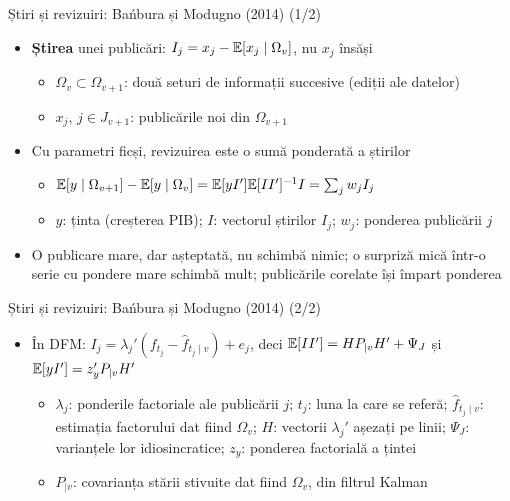 \begin{frame}{Știri și revizuiri: Bańbura și Modugno (2014) (1/2)}
\itemsize{\small}
\begin{itemize}
    \item \textbf{Știrea} unei publicări: $I_j = x_j - \mathbb{E}[x_j\mid\Omega_v]$, nu $x_j$ însăși
    \begin{itemize}
        \item $\Omega_v \subset \Omega_{v+1}$: două seturi de informații succesive (ediții ale datelor)
        \item $x_j$, $j \in J_{v+1}$: publicările noi din $\Omega_{v+1}$
    \end{itemize}
    \item Cu parametri ficși, revizuirea este o sumă ponderată a știrilor 
    \begin{itemize}
        \item $\mathbb{E}[y\mid\Omega_{v+1}] - \mathbb{E}[y\mid\Omega_v] = \mathbb{E}[yI']\mathbb{E}[II']^{-1}I = \sum_j w_jI_j$
        \item $y$: ținta (creșterea PIB); $I$: vectorul știrilor $I_j$; $w_j$: ponderea publicării $j$
    \end{itemize}
    \item O publicare mare, dar așteptată, nu schimbă nimic; o surpriză mică într-o serie cu pondere mare schimbă mult; publicările corelate își împart ponderea
\end{itemize}
\end{frame}

\begin{frame}{Știri și revizuiri: Bańbura și Modugno (2014) (2/2)}
\itemsize{\small}
\begin{itemize}
    \item În DFM: $I_j = \lambda_j'(f_{t_j} - \hat f_{t_j\mid v}) + e_j$, deci $\mathbb{E}[II'] = H P_{\mid v}H' + \Psi_J$ și $\mathbb{E}[yI'] = z_y'P_{\mid v}H'$
    \begin{itemize}
        \item $\lambda_j$: ponderile factoriale ale publicării $j$; $t_j$: luna la care se referă; $\hat f_{t_j\mid v}$: estimația factorului dat fiind $\Omega_v$; $H$: vectorii $\lambda_j'$ așezați pe linii; $\Psi_J$: varianțele lor idiosincratice; $z_y$: ponderea factorială a țintei
        \item $P_{\mid v}$: covarianța stării stivuite dat fiind $\Omega_v$, din filtrul Kalman
    \end{itemize}
\end{itemize}
\end{frame}

